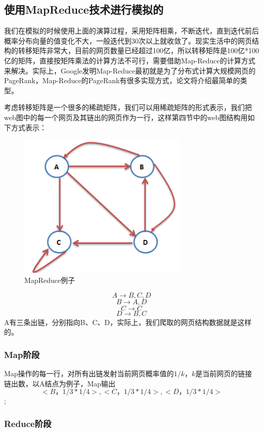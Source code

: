 \documentclass[UTF8
]{ctexart}
\begin{document}
\hypertarget{header-n95}{%
\subsection{使用MapReduce技术进行模拟的}\label{header-n95}}
我们在模拟的时候使用上面的演算过程，采用矩阵相乘，不断迭代，直到迭代前后概率分布向量的值变化不大，一般迭代到30次以上就收敛了。现实生活中的网页结构的转移矩阵非常大，目前的网页数量已经超过100亿，所以转移矩阵是100亿*100亿的矩阵，直接按矩阵乘法的计算方法不可行，需要借助Map-Reduce的计算方式来解决。实际上，Google发明Map-Reduce最初就是为了分布式计算大规模网页的PageRank，Map-Reduce的PageRank有很多实现方式，论文将介绍最简单的类型。

考虑转移矩阵是一个很多的稀疏矩阵，我们可以用稀疏矩阵的形式表示，我们把web图中的每一个网页及其链出的网页作为一行，这样第四节中的web图结构用如下方式表示：
\begin{figure}[htbp]
	\centering
	\includegraphics[width=3.2in]{1_4.jpg}
	\caption{MapReduce例子}
	\label{img4}
\end{figure}
\[A \to B,C,D\]
\[B \to A,D\]
\[C \to C\]
\[D \to B,C\]
A有三条出链，分别指向B、C、D，实际上，我们爬取的网页结构数据就是这样的。

\hypertarget{header-n100}{
\subsubsection{Map阶段}
\label{header-n100}}

Map操作的每一行，对所有出链发射当前网页概率值的\(1/k\)，\(k\)是当前网页的链接链出数，以A结点为例子，Map输出\[<B，1/3*1/4>,<C，1/3*1/4>,<D，1/3*1/4>\];

\hypertarget{header-n101}{
	\subsubsection{Reduce阶段}
	\label{header-n101}}
\end{document}
